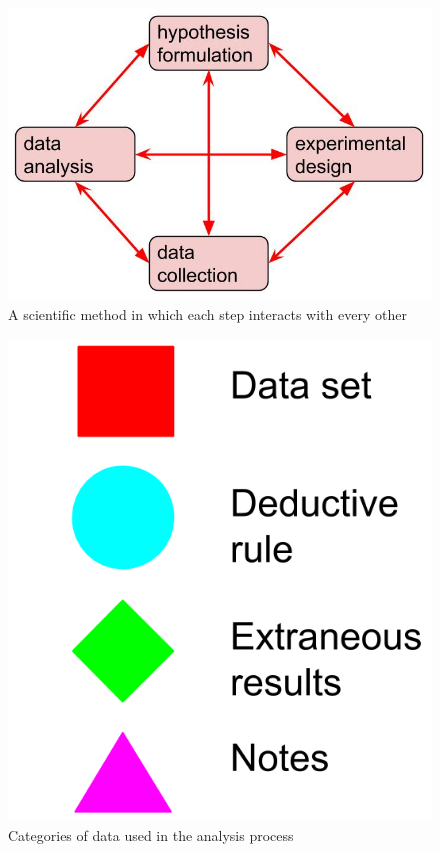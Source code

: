 \begin{figure}
  \includegraphics[scale=0.5]{figures/scientific_method}
  \caption{A scientific method in which each step interacts with every other}
  \label{scientific_method}
\end{figure}

\begin{figure}
  \includegraphics[scale=0.5]{figures/data_key}
  \caption{Categories of data used in the analysis process}
  \label{data_key}
\end{figure}

